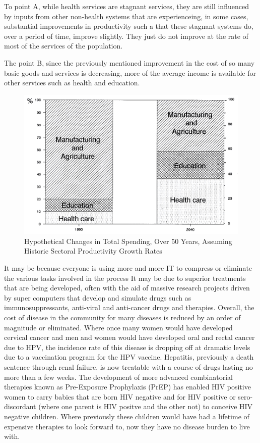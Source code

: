 To point A, while health services are stagnant services, they are still influenced by inputs from other non-health systems that are experienceing, in some cases, substantial improvements in productivity such a that these stagnant systems do, over a period of time, improve slightly. They just do not improve at the rate of most of the services of the population. 

The point B, since the previously mentioned improvement in the cost of so many basic goods and services is decreasing, more of the average income is available for other services such as health and education.

\begin{figure}
\centering
\includegraphics[scale=1.0]{figures/BaumolHealthSpendChng.png}
\caption{Hypothetical Changes in Total Spending, Over 50 Years, Assuming Historic Sectoral Productivity Growth Rates\cite[p633]{RefWorks:208}}
\end{figure}

It may be because everyone is using more and more IT to compress or eliminate the various tasks involved in the process
It may be due to superior treatments that are being developed, often with the aid of massive research projects driven by super computers that develop and simulate drugs such as immunosuppressants, anti-viral and anti-cancer drugs and therapies. Overall, the cost of disease in the community for many diseases is reduced by an order of magnitude or eliminated. Where once many women would have developed cervical cancer and men and women would have developed oral and rectal cancer due to HPV, the incidence rate of this disease is dropping off at dramatic levels due to a vaccination program for the HPV vaccine. Hepatitis, previously a death sentence through renal failure, is now treatable with a course of drugs lasting no more than a few weeks. The development of more advanced combinatorial therapies known as Pre-Exposure Prophylaxis (PrEP) has enabled HIV positive women to carry babies that are born HIV negative and for HIV positive or sero-discordant (where one parent is HIV positve and the other not) to conceive HIV negative children. Where previously these children would have had a lifetime of expensive therapies to look forward to, now they have no disease burden to live with.

